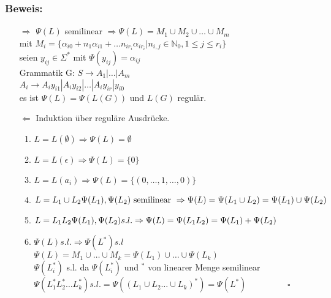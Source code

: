 	\subsubsection{Beweis:}
    \begin{itemize}
        \item[$\Rightarrow$] $\Psi(L)$ semilinear $\Rightarrow \Psi(L)=
            M_1\cup M_2\cup\dots\cup M_m$ \\mit $M_i =\{\alpha_{i0}+n_1\alpha_{i1}+\dots n_{ir_{i}}\alpha_{ir_{i}}|n_{i,j}\in\mathds{N}_0, 1\leq j \leq r_i\}$\\
            seien $y_{ij} \in \Sigma^*$ mit $\Psi(y_{ij})=\alpha_{ij}$\\
            Grammatik G: $S\rightarrow A_1|\dots|A_m$\\
            $A_i\rightarrow A_iy_{i1}| A_iy_{i2}|\dots| A_iy_{ir}|y_{i0}$\\
            es ist $\Psi(L)=\Psi(L(G))$ und $L(G)$ regulär.
        \item[$\Leftarrow$] Induktion über reguläre Ausdrücke.
            \begin{enumerate}
                \item $L=L(\emptyset) \Rightarrow \Psi(L)=\emptyset$
                \item $L=L(\epsilon) \Rightarrow \Psi(L)=\{0\}$
                \item $L=L(a_i) \Rightarrow \Psi(L)= \{(0,\dots,1,\dots, 0)\}$
                \item $L=L_1 \cup L_2\\\Psi(L_1),\Psi(L_2)\text{ semilinear }\Rightarrow \Psi(L)= \Psi(L_1\cup L_2)=\Psi(L_1)\cup \Psi(L_2)$
                \item $L=L_1L_2\\\Psi(L_1),\Psi(L_2) s.l. \Rightarrow \Psi(L)= \Psi(L_1L_2)=\Psi(L_1)+ \Psi(L_2)$
                \item $\Psi(L) s.l. \Rightarrow \Psi(L^*) s.l$\\
                $\Psi(L)=M_1\cup\dots\cup M_k =\Psi(L_1)\cup\dots\cup\Psi(L_k)$\\
                $\Psi(L_i^*)$ s.l. da $\Psi(L_i^*)$ und $^*$ von linearer Menge semilinear\\
                $\Psi(L_1^*L_2^*\dots L_k^*) s.l. = \Psi((L_1\cup L_2\dots \cup L_k)^*)=\Psi(L^*) \hspace{2cm} \square$
            \end{enumerate}
    \end{itemize}


